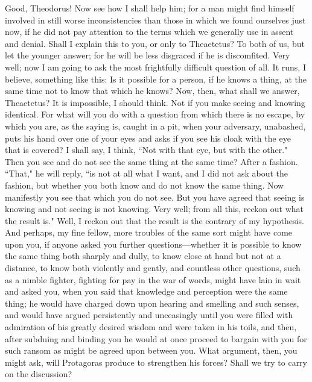 \documentclass[letterpaper,12pt]{article}
\newcommand{\stephpag}[1]{\marginnote{\small\itshape\fontfamily{ppl}\selectfont #1}}
\begin{document}
\begin{drama}
\socratesspeaks
Good, Theodorus! Now see how I shall help him; for a man might find himself involved in still worse inconsistencies than those in which we found ourselves just now, if he did not pay attention to the terms which we generally use in assent and denial. Shall I explain this to you, or only to Theaetetus?
\theodorusspeaks
To both of us, but let the younger answer; \stephpag{b} for he will be less disgraced if he is discomfited.
\socratesspeaks
Very well; now I am going to ask the most frightfully difficult question of all. It runs, I believe, something like this: Is it possible for a person, if he knows a thing, at the same time not to know that which he knows?
\theodorusspeaks
Now, then, what shall we answer, Theaetetus?
\theaetetusspeaks
It is impossible, I should think.
\socratesspeaks
Not if you make seeing and knowing identical. For what will you do with a question from which there is no escape, by which you are, as the saying is, caught in a pit, when your adversary, unabashed, puts his hand over one of your eyes and asks \stephpag{c} if you see his cloak with the eye that is covered?
\theaetetusspeaks
I shall say, I think, ``Not with that eye, but with the other."
\socratesspeaks
Then you see and do not see the same thing at the same time?
\theaetetusspeaks
After a fashion.
\socratesspeaks
``That," he will reply, ``is not at all what I want, and I did not ask about the fashion, but whether you both know and do not know the same thing. Now manifestly you see that which you do not see. But you have agreed that seeing is knowing and not seeing is not knowing. Very well; from all this, reckon out what the result is." \stephpag{d}
\theaetetusspeaks
Well, I reckon out that the result is the contrary of my hypothesis.
\socratesspeaks
And perhaps, my fine fellow, more troubles of the same sort might have come upon you, if anyone asked you further questions—whether it is possible to know the same thing both sharply and dully, to know close at hand but not at a distance, to know both violently and gently, and countless other questions, such as a nimble fighter, fighting for pay in the war of words, might have lain in wait and asked you, when you said that knowledge and perception were the same thing; he would have charged down upon hearing and smelling and such senses, \stephpag{e} and would have argued persistently and unceasingly until you were filled with admiration of his greatly desired wisdom and were taken in his toils, and then, after subduing and binding you he would at once proceed to bargain with you for such ransom as might be agreed upon between you. What argument, then, you might ask, will Protagoras produce to strengthen his forces? Shall we try to carry on the discussion?

\end{drama}
\end{document}
